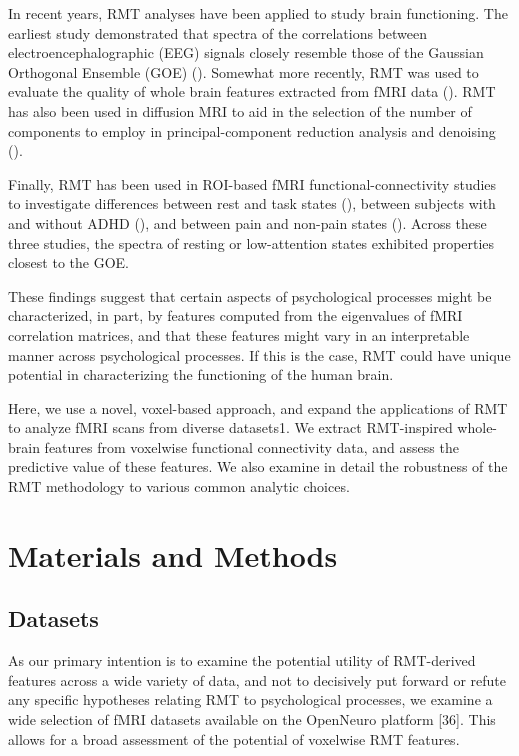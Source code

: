 In recent years, RMT analyses have been applied to study brain functioning.  The earliest  study
demonstrated that spectra of the correlations between electroencephalographic (EEG) signals closely
resemble those of the Gaussian Orthogonal Ensemble (GOE) (\cite{sebaRandomMatrixAnalysis2003}).
Somewhat more recently, RMT was used to evaluate the quality of whole brain features extracted from
fMRI data (\cite{voultsidouFeatureEvaluationFMRI2007,verganiRestingStateFMRI2019}). RMT has also
been used in diffusion MRI to aid in the selection of the number of components to employ in
principal-component reduction analysis and denoising
(\cite{veraartDenoisingDiffusionMRI2016,verganiRestingStateFMRI2019,ulfarssonDimensionEstimationNoisy2008}).

Finally, RMT has been used in ROI-based fMRI functional-connectivity studies to investigate
differences between rest and task states (\cite{wangSpectralPropertiesTemporal2015}), between
subjects with and without ADHD (\cite{wangRandomMatrixTheory2016}), and between pain and non-pain
states (\cite{matharooSpontaneousBackpainAlters2020}). Across these three studies, the spectra of
resting or low-attention states exhibited properties closest to the GOE.

These findings suggest that certain aspects of psychological processes might be characterized, in
part, by features computed from the eigenvalues of fMRI correlation matrices, and that these
features might vary in an interpretable manner across psychological processes. If this is the case,
RMT could have unique potential in characterizing the functioning of the human brain.

Here, we use a novel, voxel-based approach, and expand the applications of RMT to analyze fMRI scans
from  diverse datasets1. We extract RMT-inspired whole-brain features from voxelwise functional
connectivity data, and assess the predictive value of these features. We also examine in detail the
robustness of the RMT methodology to various common analytic choices.

\section{Materials and Methods}

\subsection{Datasets}

As our primary intention is to examine the potential utility of RMT-derived features across a wide
variety of data, and not to decisively put forward or refute any specific hypotheses relating RMT to
psychological processes, we examine a wide selection of fMRI datasets available on the OpenNeuro
platform [36].  This allows for a broad assessment of the potential of voxelwise RMT features.

